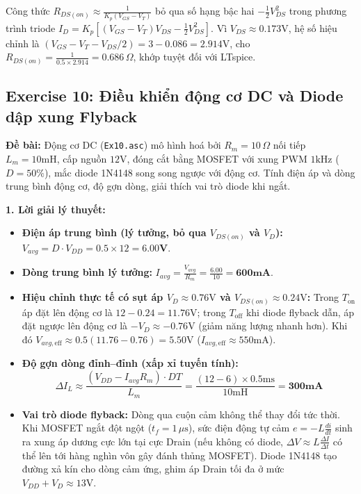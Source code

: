 \documentclass[11pt,a4paper]{article}
\newcommand{\cmd}[1]{\texttt{#1}}
\begin{document}
\begin{notebox}
Công thức $R_{DS(on)} \approx \frac{1}{K_p(V_{GS}-V_T)}$ bỏ qua số hạng bậc hai $-\frac{1}{2}V_{DS}^2$ trong phương trình triode $I_D = K_p[(V_{GS}-V_T)V_{DS} - \frac{1}{2}V_{DS}^2]$. Vì $V_{DS} \approx 0.173\text{V}$, hệ số hiệu chỉnh là $(V_{GS}-V_T - V_{DS}/2) = 3 - 0.086 = 2.914\text{V}$, cho $R_{DS(on)} = \frac{1}{0.5 \times 2.914} = 0.686\,\Omega$, khớp tuyệt đối với LTspice.
\end{notebox}

\subsection{Exercise 10: Điều khiển động cơ DC và Diode dập xung Flyback}
\textbf{Đề bài:} Động cơ DC (\cmd{Ex10.asc}) mô hình hoá bởi $R_m=10\,\Omega$ nối tiếp $L_m=10\text{mH}$, cấp nguồn $12\text{V}$, đóng cắt bằng MOSFET với xung PWM $1\text{kHz}$ ($D=50\%$), mắc diode 1N4148 song song ngược với động cơ. Tính điện áp và dòng trung bình động cơ, độ gợn dòng, giải thích vai trò diode khi ngắt.

\textbf{1. Lời giải lý thuyết:}
\begin{itemize}[itemsep=1pt]
  \item \textbf{Điện áp trung bình (lý tưởng, bỏ qua $V_{DS(on)}$ và $V_D$):} $V_{avg} = D \cdot V_{DD} = 0.5 \times 12 = \mathbf{6.00\text{V}}$.
  \item \textbf{Dòng trung bình lý tưởng:} $I_{avg} = \frac{V_{avg}}{R_m} = \frac{6.00}{10} = \mathbf{600\text{mA}}$.
  \item \textbf{Hiệu chỉnh thực tế có sụt áp $V_D \approx 0.76\text{V}$ và $V_{DS(on)} \approx 0.24\text{V}$:} Trong $T_{\text{on}}$ áp đặt lên động cơ là $12 - 0.24 = 11.76\text{V}$; trong $T_{\text{off}}$ khi diode flyback dẫn, áp đặt ngược lên động cơ là $-V_D \approx -0.76\text{V}$ (giảm năng lượng nhanh hơn). Khi đó $V_{avg,\text{eff}} \approx 0.5(11.76 - 0.76) = 5.50\text{V}$ ($I_{avg,\text{eff}} \approx 550\text{mA}$).
  \item \textbf{Độ gợn dòng đỉnh--đỉnh (xấp xỉ tuyến tính):}
  $$\Delta I_L \approx \frac{(V_{DD} - I_{avg} R_m) \cdot D T}{L_m} = \frac{(12 - 6) \times 0.5\text{ms}}{10\text{mH}} = \mathbf{300\text{mA}}$$
  \item \textbf{Vai trò diode flyback:} Dòng qua cuộn cảm không thể thay đổi tức thời. Khi MOSFET ngắt đột ngột ($t_f = 1\,\mu\text{s}$), sức điện động tự cảm $e = -L \frac{di}{dt}$ sinh ra xung áp dương cực lớn tại cực Drain (nếu không có diode, $\Delta V \approx L\frac{\Delta I}{\Delta t}$ có thể lên tới hàng nghìn vôn gây đánh thủng MOSFET). Diode 1N4148 tạo đường xả kín cho dòng cảm ứng, ghim áp Drain tối đa ở mức $V_{DD} + V_D \approx 13\text{V}$.
\end{itemize}
\end{document}
